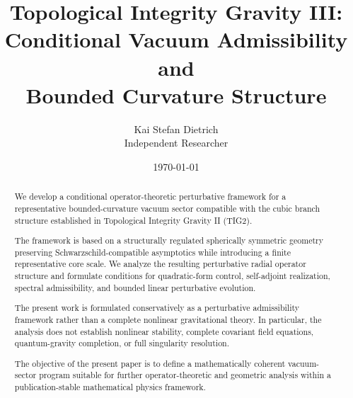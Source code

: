 \documentclass[12pt]{article}
\title{
\Large
Topological Integrity Gravity III:\\[0.3cm]
\large
Conditional Vacuum Admissibility and\\
Bounded Curvature Structure
}
\author{
Kai Stefan Dietrich\\
Independent Researcher
}
\date{\today}
\begin{document}
\maketitle


\begin{abstract}

We develop a conditional operator-theoretic perturbative framework for a representative bounded-curvature vacuum sector compatible with the cubic branch structure established in Topological Integrity Gravity II (TIG2).

The framework is based on a structurally regulated spherically symmetric geometry preserving Schwarzschild-compatible asymptotics while introducing a finite representative core scale. We analyze the resulting perturbative radial operator structure and formulate conditions for quadratic-form control, self-adjoint realization, spectral admissibility, and bounded linear perturbative evolution.

The present work is formulated conservatively as a perturbative admissibility framework rather than a complete nonlinear gravitational theory. In particular, the analysis does not establish nonlinear stability, complete covariant field equations, quantum-gravity completion, or full singularity resolution.

The objective of the present paper is to define a mathematically coherent vacuum-sector program suitable for further operator-theoretic and geometric analysis within a publication-stable mathematical physics framework.

\end{abstract}













\end{document}

